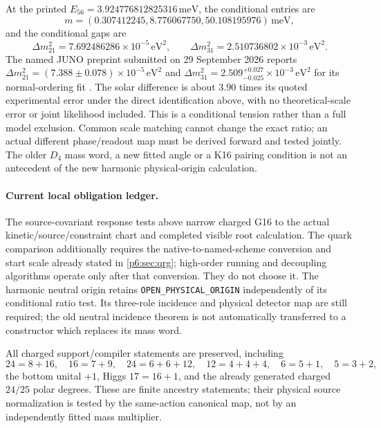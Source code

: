 \documentclass[12pt,a4paper]{article}
\begin{document}
\begin{remark}
\label{p6:rem:v2210-lit-harmonic-observation}
At the printed \(E_{56}=3.924776812825316\,\mathrm{meV}\), the conditional
entries are
\[
 m=(0.307412245,
       8.776067750,
       50.108195976)\,\mathrm{meV},
\]
and the conditional gaps are
\[
 \Delta m_{21}^2=7.692486286\times10^{-5}\,\mathrm{eV}^2,
 \qquad
 \Delta m_{31}^2=2.510736802\times10^{-3}\,\mathrm{eV}^2.
\]
The named JUNO preprint submitted on 29 September 2026 reports
\(\Delta m_{21}^2=(7.388\pm0.078)\times10^{-5}\,\mathrm{eV}^2\) and
\(\Delta m_{31}^2=2.509^{+0.027}_{-0.025}\times10^{-3}\,\mathrm{eV}^2\)
for its normal-ordering fit \cite{LitSMJUNO2026}.  The solar difference is
about \(3.90\) times its quoted experimental error under the direct
identification above, with no theoretical-scale error or joint likelihood
included.  This is a conditional tension rather than a full model exclusion.
Common scale matching cannot change the exact ratio; an actual different
phase/readout map must be derived forward and tested jointly.  The older
\(D_4\) mass word, a new fitted angle or a K16 pairing condition is not an
antecedent of the new harmonic physical-origin calculation.
\end{remark}

\paragraph{Current local obligation ledger.}
The source-covariant response tests above narrow charged G16 to the actual
kinetic/source/constraint chart and completed visible root calculation.  The
quark comparison additionally requires the native-to-named-scheme conversion
and start scale already stated in \ref{p6:sec:qrg}; high-order running and
decoupling algorithms \cite{LitSMQuarkRunning2017} operate only after that
conversion.  They do not choose it.  The harmonic neutral origin retains
\texttt{OPEN\_PHYSICAL\_ORIGIN} independently of its conditional ratio
test.  Its three-role incidence and physical detector map are still required;
the old neutral incidence theorem is not automatically transferred to a
constructor which replaces its mass word.

All charged support/compiler statements are preserved, including
\[
 24=8+16,\quad16=7+9,\quad
 24=6+6+12,\quad12=4+4+4,\quad6=5+1,\quad5=3+2,
\]
the bottom unital \(+1\), Higgs \(17=16+1\), and the already generated
charged \(24/25\) polar degrees.  These are finite ancestry statements;
their physical source normalization is tested by the same-action canonical
map, not by an independently fitted mass multiplier.
\end{document}
